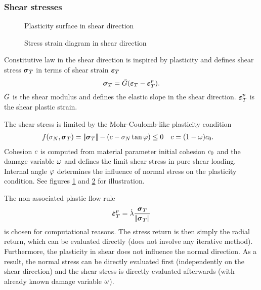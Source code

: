 \subsubsection{Shear stresses}

\begin{figure}
	\centering
	\caption{Plasticity surface in shear direction}
	\label{figCpmShearPlastSurf}
\end{figure}
\begin{figure}
	\centering
	\caption{Stress strain diagram in shear direction}
	\label{figCpmStressStrainShear}
\end{figure}

Constitutive law in the shear direction is inspired by plasticity and defines shear stress $\linkStressShearVector$ in terms of shear strain $\linkStrainShearVector$
\begin{equation}
	\linkStressShearVector = \linkMaterialStiffnessShear(\linkStrainShearVector-\linkStrainShearVectorPlastic)
	.
\end{equation}
$\linkMaterialStiffnessShear$ is the shear modulus and defines the elastic slope in the shear direction.
$\linkStrainShearVectorPlastic$ is the shear plastic strain.

The shear stress is limited by the Mohr-Coulomb-like plasticity condition
\begin{align}
	f(\linkStressNormal,\linkStressShearVector)
	&=
	\norm{\linkStressShearVector} - (\cohesion-\linkStressNormal\tan\frictionAngle)
	\le 0
	&
	\cohesion &= (1-\damage)\cohesionInitial
	.
\end{align}
Cohesion $c$ is computed from material parameter initial cohesion $c_0$ and the damage variable $\omega$ and defines the limit shear stress in pure shear loading.
Internal angle $\varphi$ determines the influence of normal stress on the plasticity condition.
See figures \ref{figCpmShearPlastSurf} and \ref{figCpmStressStrainShear} for illustration.

The non-associated plastic flow rule
\begin{equation}
	\linkStrainShearVectorPlasticRate = \dot\lambda\frac{\linkStressShearVector}{\norm{\linkStressShearVector}}
\end{equation}
is chosen for computational reasons.
The stress return is then simply the radial return, which can be evaluated directly (does not involve any iterative method).
Furthermore, the plasticity in shear does not influence the normal direction.
As a result, the normal stress can be directly evaluated first (independently on the shear direction) and the shear stress is directly evaluated afterwards (with already known damage variable $\omega$).





